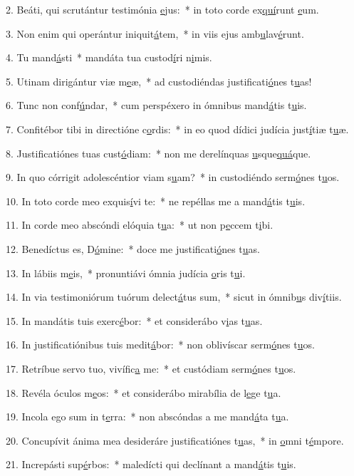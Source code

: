 2. Beáti, qui scrutántur testimónia \uline{e}jus:~* in toto corde ex\uline{quí}runt \uline{e}um.\par 
3. Non enim qui operántur iniquit\uline{á}tem,~* in viis ejus amb\uline{u}lav\uline{é}runt.\par 
4. Tu mand\uline{á}sti~* mandáta tua custod\uline{í}ri n\uline{i}mis.\par 
5. Utinam dirigántur viæ m\uline{e}æ,~* ad custodiéndas justificati\uline{ó}nes t\uline{u}as!\par 
6. Tunc non conf\uline{ú}ndar,~* cum perspéxero in ómnibus mand\uline{á}tis t\uline{u}is.\par 
7. Confitébor tibi in directióne c\uline{o}rdis:~* in eo quod dídici judícia just\uline{í}tiæ t\uline{u}æ.\par 
8. Justificatiónes tuas cust\uline{ó}diam:~* non me derelínquas \uline{u}sque\uline{quá}que.\par 
9. In quo córrigit adolescéntior viam s\uline{u}am?~* in custodiéndo serm\uline{ó}nes t\uline{u}os.\par 
10. In toto corde meo exquis\uline{í}vi te:~* ne repéllas me a mand\uline{á}tis t\uline{u}is.\par 
11. In corde meo abscóndi elóquia t\uline{u}a:~* ut non p\uline{e}ccem t\uline{i}bi.\par 
12. Benedíctus es, D\uline{ó}mine:~* doce me justificati\uline{ó}nes t\uline{u}as.\par 
13. In lábiis m\uline{e}is,~* pronuntiávi ómnia judícia \uline{o}ris t\uline{u}i.\par 
14. In via testimoniórum tuórum delect\uline{á}tus sum,~* sicut in ómnib\uline{u}s div\uline{í}tiis.\par 
15. In mandátis tuis exerc\uline{é}bor:~* et considerábo v\uline{i}as t\uline{u}as.\par 
16. In justificatiónibus tuis medit\uline{á}bor:~* non oblivíscar serm\uline{ó}nes t\uline{u}os.\par 
17. Retríbue servo tuo, vivífic\uline{a} me:~* et custódiam serm\uline{ó}nes t\uline{u}os.\par 
18. Revéla óculos m\uline{e}os:~* et considerábo mirabília de l\uline{e}ge t\uline{u}a.\par 
19. Incola ego sum in t\uline{e}rra:~* non abscóndas a me mand\uline{á}ta t\uline{u}a.\par 
20. Concupívit ánima mea desideráre justificatiónes t\uline{u}as,~* in \uline{o}mni t\uline{é}mpore.\par 
21. Increpásti sup\uline{é}rbos:~* maledícti qui declínant a mand\uline{á}tis t\uline{u}is.\par 
